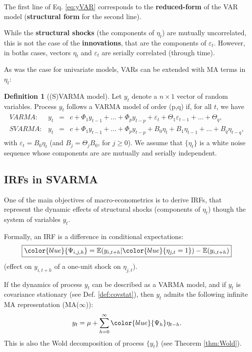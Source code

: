 \documentclass[
  12pt,
]{book}
\theoremstyle{definition}
\newtheorem{definition}{Definition}[chapter]
\theoremstyle{definition}
\theoremstyle{definition}
\theoremstyle{definition}
\theoremstyle{remark}
\begin{document}
The first line of Eq. \eqref{eq:yVAR} corresponds to the \textbf{reduced-form} of the VAR model (\textbf{structural form} for the second line).

While the \textbf{structural shocks} (the components of \(\eta_t\)) are mutually uncorrelated, this is not the case of the \textbf{innovations}, that are the components of \(\varepsilon_t\). However, in boths cases, vectors \(\eta_t\) and \(\varepsilon_t\) are serially correlated (through time).

As was the case for univariate models, VARs can be extended with MA terms in \(\eta_t\):

\begin{definition}[(S)VARMA model]
\protect\hypertarget{def:SVARMA}{}\label{def:SVARMA}Let \(y_{t}\) denote a \(n \times1\) vector of random variables. Process \(y_{t}\) follows a VARMA model of order (p,q) if, for all \(t\), we have
\begin{eqnarray}
\begin{array}{rllll}
VARMA:& y_t &=& c + \Phi_1 y_{t-1} + \dots + \Phi_p y_{t-p} + \varepsilon_t + \Theta_1\varepsilon_{t-1} + \dots + \Theta_q ,\\
SVARMA:& y_t &=& c + \Phi_1 y_{t-1} + \dots + \Phi_p y_{t-p} + B_0 \eta_t+ B_1 \eta_{t-1} + \dots +  B_q \eta_{t-q},
\end{array}\label{eq:yVARMA}
\end{eqnarray}
with \(\varepsilon_t = B_0\eta_t\) (and \(B_j = \Theta_j B_0\), for \(j \ge 0\)). We assume that \(\{\eta_{t}\}\) is a white noise sequence whose components are are mutually and serially independent.
\end{definition}

\hypertarget{IRFSVARMA}{%
\subsection{IRFs in SVARMA}\label{IRFSVARMA}}

One of the main objectives of macro-econometrics is to derive IRFs, that represent the dynamic effects of structural shocks (components of \(\eta_t\)) though the system of variables \(y_t\).

Formally, an IRF is a difference in conditional expectations:
\[
\boxed{\color{blue}{\Psi_{i,j,h}} = \mathbb{E}(y_{i,t+h}|\color{blue}{\eta_{j,t}=1}) - \mathbb{E}(y_{i,t+h})}
\]
(effect on \(y_{i,t+h}\) of a one-unit shock on \(\eta_{j,t}\)).

If the dynamics of process \(y_t\) can be described as a VARMA model, and if \(y_t\) is covariance stationary (see Def. \ref{def:covstat}), then \(y_t\) admits the following infinite MA representation (MA(\(\infty\))):
\begin{equation}
y_t = \mu + \sum_{h=0}^\infty \color{blue}{\Psi_{h}} \eta_{t-h}.\label{eq:InfMA}
\end{equation}
This is also the Wold decomposition of process \(\{y_t\}\) (see Theorem \ref{thm:Wold}).
\end{document}
